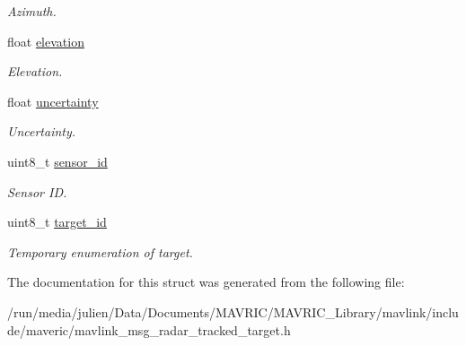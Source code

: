 \begin{DoxyCompactItemize}
\begin{DoxyCompactList}\small\item\em Azimuth. \end{DoxyCompactList}\item 
\hypertarget{struct____mavlink__radar__tracked__target__t_a85946ead59d1438a0ee0b9be417c162b}{float \hyperlink{struct____mavlink__radar__tracked__target__t_a85946ead59d1438a0ee0b9be417c162b}{elevation}}\label{struct____mavlink__radar__tracked__target__t_a85946ead59d1438a0ee0b9be417c162b}

\begin{DoxyCompactList}\small\item\em Elevation. \end{DoxyCompactList}\item 
\hypertarget{struct____mavlink__radar__tracked__target__t_a5691e22005ab2fbc665142fba1f3fab5}{float \hyperlink{struct____mavlink__radar__tracked__target__t_a5691e22005ab2fbc665142fba1f3fab5}{uncertainty}}\label{struct____mavlink__radar__tracked__target__t_a5691e22005ab2fbc665142fba1f3fab5}

\begin{DoxyCompactList}\small\item\em Uncertainty. \end{DoxyCompactList}\item 
\hypertarget{struct____mavlink__radar__tracked__target__t_ab908ac1fc8cc3e4037ec1d41f9067b1d}{uint8\+\_\+t \hyperlink{struct____mavlink__radar__tracked__target__t_ab908ac1fc8cc3e4037ec1d41f9067b1d}{sensor\+\_\+id}}\label{struct____mavlink__radar__tracked__target__t_ab908ac1fc8cc3e4037ec1d41f9067b1d}

\begin{DoxyCompactList}\small\item\em Sensor I\+D. \end{DoxyCompactList}\item 
\hypertarget{struct____mavlink__radar__tracked__target__t_a2bcb68fbc83b7b8f3aa5565528b83d2c}{uint8\+\_\+t \hyperlink{struct____mavlink__radar__tracked__target__t_a2bcb68fbc83b7b8f3aa5565528b83d2c}{target\+\_\+id}}\label{struct____mavlink__radar__tracked__target__t_a2bcb68fbc83b7b8f3aa5565528b83d2c}

\begin{DoxyCompactList}\small\item\em Temporary enumeration of target. \end{DoxyCompactList}\end{DoxyCompactItemize}


The documentation for this struct was generated from the following file\+:\begin{DoxyCompactItemize}
\item 
/run/media/julien/\+Data/\+Documents/\+M\+A\+V\+R\+I\+C/\+M\+A\+V\+R\+I\+C\+\_\+\+Library/mavlink/include/maveric/mavlink\+\_\+msg\+\_\+radar\+\_\+tracked\+\_\+target.\+h\end{DoxyCompactItemize}
